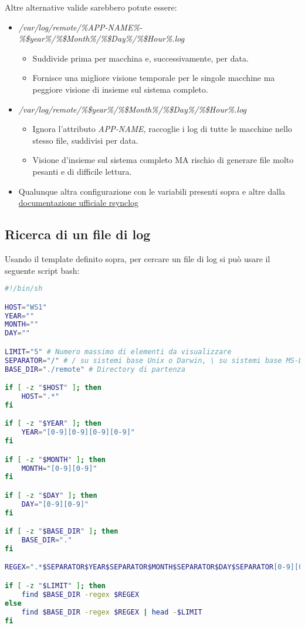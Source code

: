 \documentclass[../DocumentazioneProgetto.tex]{subfiles}
\begin{document}
Altre alternative valide sarebbero potute essere:
\begin{itemize}
	\item \textit{/var/log/remote/\%APP-NAME\%-\%\$year\%/\%\$Month\%/\%\$Day\%/\%\$Hour\%.log}
	\begin{itemize}
		\item Suddivide prima per macchina e, successivamente, per data.
		\item Fornisce una migliore visione temporale per le singole macchine ma peggiore visione di insieme sul sistema completo.
	\end{itemize}
	\item \textit{/var/log/remote/\%\$year\%/\%\$Month\%/\%\$Day\%/\%\$Hour\%.log}
	\begin{itemize}
		\item Ignora l'attributo \textit{APP-NAME}, raccoglie i log di tutte le macchine nello stesso file, suddivisi per data.
		\item Visione d'insieme sul sistema completo MA rischio di generare file molto pesanti e di difficile lettura. 
	\end{itemize}
	\item Qualunque altra configurazione con le variabili presenti sopra e altre dalla \href{https://www.rsyslog.com/doc/master/configuration/properties.html}{documentazione ufficiale rsynclog}
\end{itemize}
\subsection{Ricerca di un file di log} 
Usando il template definito sopra, per cercare un file di log si può usare il seguente script bash:
\begin{lstlisting}[language=Bash, caption=Script per ricercare log dati specifici parametri] 
#!/bin/sh

HOST="WS1"
YEAR=""
MONTH=""
DAY=""

LIMIT="5" # Numero massimo di elementi da visualizzare
SEPARATOR="/" # / su sistemi base Unix o Darwin, \ su sistemi base MS-DOS
BASE_DIR="./remote" # Directory di partenza

if [ -z "$HOST" ]; then
	HOST=".*"
fi

if [ -z "$YEAR" ]; then
	YEAR="[0-9][0-9][0-9][0-9]"
fi

if [ -z "$MONTH" ]; then
	MONTH="[0-9][0-9]"
fi

if [ -z "$DAY" ]; then
	DAY="[0-9][0-9]"
fi

if [ -z "$BASE_DIR" ]; then
	BASE_DIR="."
fi

REGEX=".*$SEPARATOR$YEAR$SEPARATOR$MONTH$SEPARATOR$DAY$SEPARATOR[0-9][0-9]-$HOST.log"

if [ -z "$LIMIT" ]; then
	find $BASE_DIR -regex $REGEX
else
	find $BASE_DIR -regex $REGEX | head -$LIMIT
fi\end{lstlisting}
\end{document}
